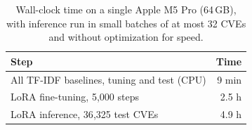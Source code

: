 \begin{table}[htbp]
\centering
\caption{Wall-clock time on a single Apple M5 Pro (64\,GB), with inference run in small batches of at most 32 CVEs and without optimization for speed.}
\label{tab:compute}
\small
\begin{tabular}{lr}
\toprule
Step & Time \\
\midrule
All TF-IDF baselines, tuning and test (CPU) & 9 min \\
LoRA fine-tuning, 5{,}000 steps & 2.5 h \\
LoRA inference, 36{,}325 test CVEs & 4.9 h \\
\bottomrule
\end{tabular}
\end{table}
